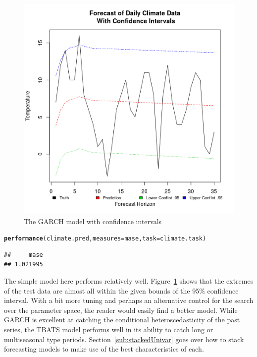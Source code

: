\documentclass[12pt]{article}\usepackage[]{graphicx}\usepackage[]{color}
\makeatletter
\newcommand{\hlstd}[1]{\textcolor[rgb]{0.345,0.345,0.345}{#1}}%
\newcommand{\hlkwc}[1]{\textcolor[rgb]{0.333,0.667,0.333}{#1}}%
\newcommand{\hlkwd}[1]{\textcolor[rgb]{0.737,0.353,0.396}{\textbf{#1}}}%
\newenvironment{kframe}{%
 \def\at@end@of@kframe{}%
 \ifinner\ifhmode%
  \def\at@end@of@kframe{\end{minipage}}%
  \begin{minipage}{\columnwidth}%
 \fi\fi%
 \def\FrameCommand##1{\hskip\@totalleftmargin \hskip-\fboxsep
 \colorbox{shadecolor}{##1}\hskip-\fboxsep
     \hskip-\linewidth \hskip-\@totalleftmargin \hskip\columnwidth}%
 \MakeFramed {\advance\hsize-\width
   \@totalleftmargin\z@ \linewidth\hsize
   \@setminipage}}%
 {\par\unskip\endMakeFramed%
 \at@end@of@kframe}
\newenvironment{knitrout}{}{} %
\theoremstyle{definition}
\makeatother
\begin{document}
\begin{figure}[h!]
\includegraphics[width=\linewidth]{plot_garch_final.png}
\centering
\caption{The GARCH model with confidence intervals}
\label{fig:garch_final}
\end{figure}

\begin{knitrout}
\color{fgcolor}\begin{kframe}
\begin{alltt}
\hlkwd{performance}\hlstd{(climate.pred,} \hlkwc{measures} \hlstd{= mase,} \hlkwc{task} \hlstd{= climate.task)}
\end{alltt}
\begin{verbatim}
##     mase 
## 1.021995
\end{verbatim}
\end{kframe}
\end{knitrout}

\doublespacing

The simple model here performs relatively well. Figure~\ref{fig:garch_final} shows that the extremes of the test data are almost all within the given bounds of the 95\% confidence interval. With a bit more tuning and perhaps an alternative control for the search over the parameter space, the reader would easily find a better model. While GARCH is excellent at catching the conditional heteroscedasticity of the past series, the TBATS model performs well in its ability to catch long or multiseasonal type periods. Section~\ref{sub:stackedUnivar} goes over how to stack forecasting models to make use of the best characteristics of each.
\end{document}
